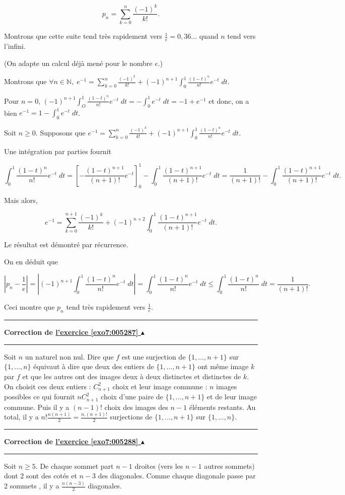 \documentclass[11pt,a4paper]{article}
\newcommand{\Nn}{\mathbb{N}} \newcommand{\N}{\mathbb{N}}
\newcounter{exo}
\newcommand{\correction}[1]{\hypertarget{cor7:#1}{}\label{cor7:#1}{\bf Correction de \hyperlink{exo7:#1}{l'exercice \ref{exo7:#1} $\blacktriangle$}}\vspace{1mm}\hrule\vspace{1mm}}
\newcommand{\fincorrection}{\vspace{1mm}\hrule\vspace*{7mm}}
\begin{document}
\begin{enumerate}
$$p_n=\sum_{k=0}^{n}\frac{(-1)^k}{k!}.$$ 

Montrons que cette suite tend très rapidement vers $\frac{1}{e}=0,36...$ quand $n$ tend vers l'infini.

(On adapte un  calcul déjà mené pour le nombre $e$.)

Montrons que $\forall n\in\Nn,\;e^{-1}=\sum_{k=0}^{n}\frac{(-1)^k}{k!}+(-1)^{n+1}\int_{0}^{1}\frac{(1-t)^n}{n!}e^{-t}\;dt$.

Pour $n=0$, $(-1)^{n+1}\int_{O}^{1}\frac{(1-t)^n}{n!}e^{-t}\;dt=-\int_{0}^{1}e^{-t}\;dt=-1+e^{-1}$ et donc, on a bien $e^{-1}=1-\int_{0}^{1}e^{-t}\;dt$.

Soit $n\geq0$. Supposons que $e^{-1}=\sum_{k=0}^{n}\frac{(-1)^k}{k!}+(-1)^{n+1}\int_{0}^{1}\frac{(1-t)^n}{n!}e^{-t}\;dt$.

Une intégration par parties fournit

$$\int_{0}^{1}\frac{(1-t)^n}{n!}e^{-t}\;dt=\left[-\frac{(1-t)^{n+1}}{(n+1)!}e^{-t}\right]_0^1-\int_{0}^{1}\frac{(1-t)^{n+1}}{(n+1)!}e^{-t}\;dt=\frac{1}{(n+1)!}-\int_{0}^{1}\frac{(1-t)^{n+1}}{(n+1)!}e^{-t}\;dt.$$

Mais alors,

$$e^{-1}=\sum_{k=0}^{n+1}\frac{(-1)^k}{k!}+(-1)^{n+2}\int_{0}^{1}\frac{(1-t)^{n+1}}{(n+1)!}e^{-t}\;dt.$$

Le résultat est démontré par récurrence.

On en déduit que

$$|p_n-\frac{1}{e}|=\left|(-1)^{n+1}\int_{0}^{1}\frac{(1-t)^n}{n!}e^{-t}\;dt\right|
=\int_{0}^{1}\frac{(1-t)^n}{n!}e^{-t}\;dt\leq\int_{0}^{1}\frac{(1-t)^n}{n!}\;dt=\frac{1}{(n+1)!}.$$

Ceci montre que $p_n$ tend très rapidement vers $\frac{1}{e}$.

\end{enumerate}
\fincorrection
\correction{005287}
Soit $n$ un naturel non nul. Dire que $f$ est une surjection de $\{1,...,n+1\}$ sur $\{1,...,n\}$ équivaut à dire que deux des entiers de $\{1,...,n+1\}$ ont même image $k$ par $f$ et que les autres ont des images deux à deux distinctes et distinctes de $k$. On choisit ces deux entiers : $C_{n+1}^2$ choix et leur image commune : $n$ images possibles ce qui fournit $nC_{n+1}^2$ choix d'une paire de $\{1,...,n+1\}$ et de leur image commune. Puis il y a $(n-1)!$ choix des images des $n-1$ éléments restants. Au total, il y a $n!\frac{n(n+1)}{2}=\frac{n.(n+1)!}{2}$ surjections de $\{1,...,n+1\}$ sur $\{1,...,n\}$.
\fincorrection
\correction{005288}
Soit $n\geq5$. De chaque sommet part $n-1$ droites (vers les $n-1$ autres sommets) dont $2$ sont des cotés et $n-3$ des diagonales. Comme chaque diagonale passe par 2 sommets , il y a $\frac{n(n-3)}{2}$ diagonales.
\end{document}
